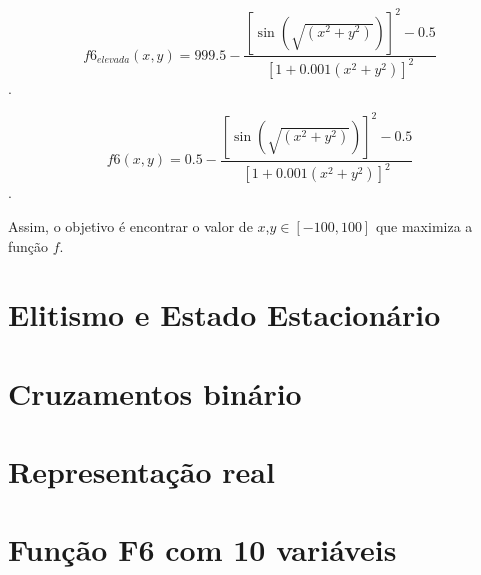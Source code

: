 \documentclass[12pt]{article}
\begin{document}
$$f6_{elevada}(x,y) = 999.5 - \frac{[\sin(\sqrt{(x^2 + y^2)})]^2 - 0.5}{[1 + 0.001(x^2 + y^2)]^2}$$.

$$f6(x,y) = 0.5 - \frac{[\sin(\sqrt{(x^2 + y^2)})]^2 - 0.5}{[1 + 0.001(x^2 + y^2)]^2}$$.


Assim, o objetivo é encontrar o valor de $x$,$y \in [-100,100]$ que maximiza a função $f$.

	\section{Elitismo e Estado Estacionário}
		

	\clearpage
	\section{Cruzamentos binário}
		

	\clearpage
	\section{Representação real}
		

	\clearpage
	\section{Função F6 com 10 variáveis}
		
\end{document}

